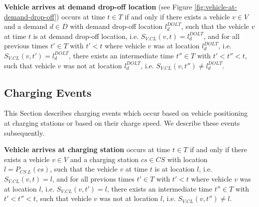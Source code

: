 \documentclass[graybox]{svmult}
\begin{document}
\vspace{4mm}

\noindent
\textbf{Vehicle arrives at demand drop-off location} (see Figure \ref{fig:vehicle-at-demand-drop-off})
occurs at time $t \in T$ if and only if there exists a vehicle $v \in V$ and a demand $d \in D$ with demand drop-off location $l_d^{DOLT}$, such that the vehicle $v$ at time $t$ is at demand drop-off location, i.e. $S_{V.CL}(v, t) = l_d^{DOLT}$, and for all previous times $t' \in T$ with $t' < t$ where vehicle $v$ was at location $l_d^{DOLT}$, i.e. $S_{V.CL}(v, t') = l_d^{DOLT}$, there exists an intermediate time $t'' \in T$ with $t' < t'' < t$, such that vehicle $v$ was not at location $l_d^{DOLT}$, i.e. $S_{V.CL}(v, t'') \neq l_d^{DOLT}$.

\vspace{-2mm}

\subsection{Charging Events}
This Section describes charging events which occur based on vehicle positioning at charging stations or based on their charge speed. We describe these events subsequently.

\vspace{4mm}

\label{sec:charging-events}
\noindent
\textbf{Vehicle arrives at charging station}
occurs at time $t \in T$ if and only if there exists a vehicle $v \in V$ and a charging station $cs \in CS$ with location $l = P_{CS.L}(cs)$, such that the vehicle $v$ at time $t$ is at location $l$, i.e. $S_{V.CL}(v, t) = l$, and for all previous times $t' \in T$ with $t' < t$ where vehicle $v$ was at location $l$, i.e. $S_{V.CL}(v, t') = l$, there exists an intermediate time $t'' \in T$ with $t' < t'' < t$, such that vehicle $v$ was not at location $l$, i.e. $S_{V.CL}(v, t'') \neq l$.

\end{document}
